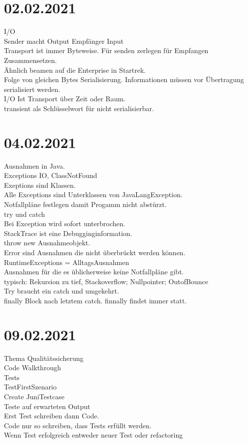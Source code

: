 \documentclass{article}
\begin{document}
	\section*{02.02.2021}
	I/O \\
	Sender macht Output Empfänger Input \\
	Transport ist immer Byteweise. Für senden zerlegen für Empfangen Zusammensetzen. \\
	Ähnlich beamen auf die Enterprise in Startrek. \\
	Folge von gleichen Bytes Serialisierung.
	Informationen müssen vor Übertragung serialisiert werden. \\
	I/O Ist Transport über Zeit oder Raum. \\
	transient als Schlüsselwort für nicht serialisierbar. \\
	\section*{04.02.2021}
	Ausnahmen in Java. \\
	Exceptions IO, ClassNotFound \\
	Exeptions sind Klassen. \\
	Alle Exceptions sind Unterklassen von JavaLangException. \\
	Notfallpläne festlegen damit Progamm nicht abstürzt. \\
	try und catch \\
	Bei Exception wird sofort unterbrochen. \\
	StackTrace ist eine Debugginginformation. \\
	throw new Ausnahmeobjekt. \\
	Error sind Ausnahmen die nicht überbrückt werden können. \\
	RuntimeExceptions = AlltagsAusnahmen \\
	Ausnahmen für die es üblicherweise keine Notfallpläne gibt. \\
	typisch: Rekursion zu tief, Stackoverflow; Nullpointer; OutofBounce \\
	Try braucht ein catch und umgekehrt. \\
	finally Block nach letztem catch. finnally findet immer statt. \\
	\section*{09.02.2021}
	Thema Qualitätssicherung \\
	Code Walkthrough \\
	Tests \\
	TestFirstSzenario \\
	Create JuniTestcase \\
	Teste auf erwarteten Output \\
	Erst Test schreiben dann Code. \\
	Code nur so schreiben, dass Tests erfüllt werden. \\
	Wenn Test erfolgreich entweder neuer Test oder refactoring \\
\end{document}

